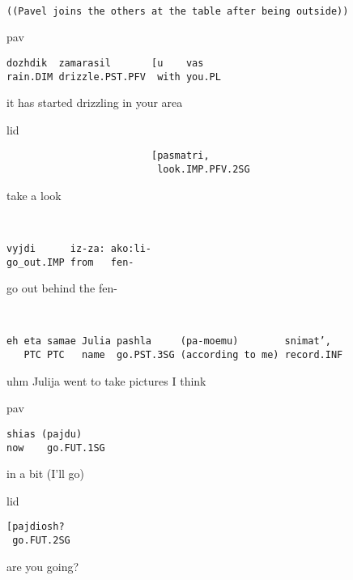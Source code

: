 \documentclass[output=paper,modfonts,nonflat]{langsci/langscibook}
\begin{document}
\vspace{2mm}
%
\begin{transbox}{1}{~}
\begin{verbatim}
((Pavel joins the others at the table after being outside))
\end{verbatim}
\end{transbox}
%
\begin{transbox}{2}{pav}
\begin{verbatim}
dozhdik  zamarasil       [u    vas
rain.DIM drizzle.PST.PFV  with you.PL
\end{verbatim}
it has started drizzling in your area
\end{transbox}
%
\begin{mdframednoverticalspace}[style=firstfoc]
\begin{transbox}{3}{lid}%
\begin{verbatim}
                         [pasmatri,
                          look.IMP.PFV.2SG
\end{verbatim}
\hspace{3.8cm} take a look
\end{transbox}
\end{mdframednoverticalspace}
%
\begin{transbox}{4}{~}
\begin{verbatim}
vyjdi      iz-za: ako:li-
go_out.IMP from   fen-
\end{verbatim}
go out behind the fen-
\end{transbox}
%
\begin{transbox}{5}{~}
\begin{verbatim} 
eh eta samae Julia pashla     (pa-moemu)        snimat’, 
   PTC PTC   name  go.PST.3SG (according to me) record.INF
\end{verbatim}
uhm Julija went to take pictures I think
\end{transbox}
%
%
\begin{mdframednoverticalspace}[style=secondfoc]
\begin{transbox}{7}{pav}%
\begin{verbatim}
shias (pajdu)
now    go.FUT.1SG
\end{verbatim}
in a bit (I’ll go)
\end{transbox}
\end{mdframednoverticalspace}
%
%
\begin{transbox}{9}{lid}%
\begin{verbatim}
[pajdiosh?
 go.FUT.2SG
\end{verbatim}
\hspace{0.07cm} are you going?
\end{transbox}
\end{document}
